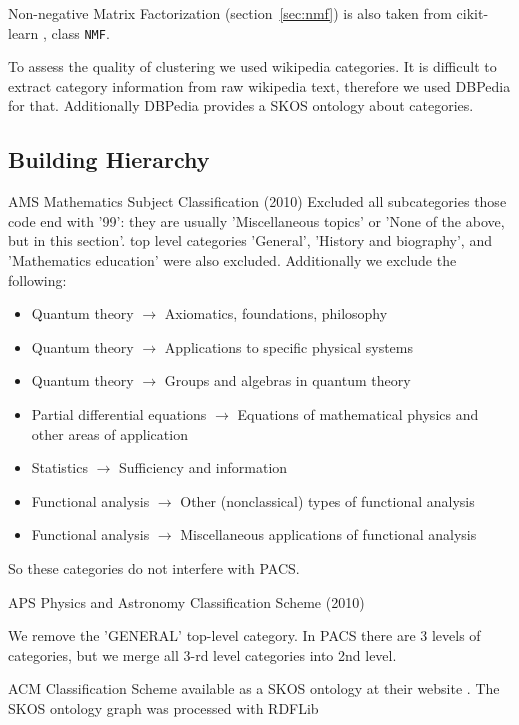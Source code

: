 Non-negative Matrix Factorization (section~\ref{sec:nmf}) is also taken from 
cikit-learn \cite{scikit-learn}, class \verb|NMF|.


To assess the quality of clustering we used wikipedia categories. 
It is difficult to extract category information from raw wikipedia text, therefore
we used DBPedia \cite{bizer2009dbpedia} for that. Additionally 
DBPedia provides a SKOS ontology about categories. 


\subsection{Building Hierarchy} 

AMS Mathematics Subject Classification (2010) \cite{ams2010msc}
Excluded all subcategories those code end with '99': they are 
usually 'Miscellaneous topics' or 'None of the above, but in this section'. 
top level categories 'General', 'History and biography', and 'Mathematics education'
were also excluded. 
Additionally we exclude the following: 

\begin{itemize}
\item Quantum theory $\to$ Axiomatics, foundations, philosophy
\item Quantum theory $\to$ Applications to specific physical systems
\item Quantum theory $\to$ Groups and algebras in quantum theory
\item Partial differential equations $\to$ Equations of mathematical physics and other areas of application
\item Statistics $\to$ Sufficiency and information
\item Functional analysis $\to$ Other (nonclassical) types of functional analysis
\item Functional analysis $\to$ Miscellaneous applications of functional analysis
\end{itemize}

So these categories do not interfere with PACS. 


APS Physics and Astronomy Classification Scheme (2010) \cite{aps2010pacs}

We remove the 'GENERAL' top-level category. 
In PACS there are 3 levels of categories, but we merge all 3-rd level categories into 
2nd level.

ACM Classification Scheme \cite{rous2012acm} available as a SKOS \cite{miles2005skos} ontology 
at their website \cite{amc2012ccs}. The SKOS ontology graph was processed with RDFLib \cite{rdflib}

